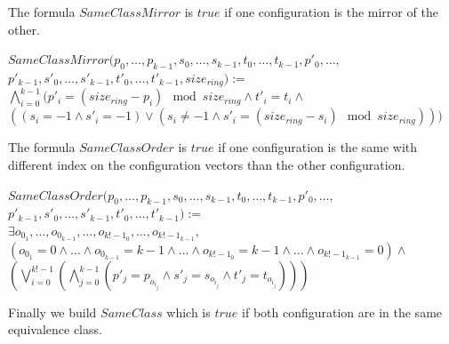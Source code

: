 \documentclass{article}
\begin{document}
\noindent The formula $SameClassMirror$ is $true$ if one configuration is the mirror of the other.

\begin{center}
    
    $SameClassMirror(p_{0}, \dots, p_{k-1}, s_{0}, \dots, s_{k-1}, t_{0}, \dots, t_{k-1}, p'_{0}, \dots,$\\
    $p'_{k-1}, s'_{0}, \dots, s'_{k-1}, t'_{0}, \dots, t'_{k-1}, size_{ring}):=$\\
    $\bigwedge_{i=0}^{k-1}( p'_{i} = (size_{ring} - p_{i})\mod{size_{ring}} \land t'_{i} = t_{i} \land$ \\
    $((s_{i} = -1 \land s'_{i} = -1) \lor (s_{i} \not= -1 \land s'_{i} = (size_{ring} - s_{i})\mod{size_{ring}}))) $
\end{center}

\noindent The formula $SameClassOrder$ is $true$ if one configuration is the same with different index on the configuration vectors than the other configuration.

\begin{center}
    
    $SameClassOrder(p_{0}, \dots, p_{k-1}, s_{0}, \dots, s_{k-1}, t_{0}, \dots, t_{k-1}, p'_{0}, \dots,$\\
    $p'_{k-1}, s'_{0}, \dots, s'_{k-1}, t'_{0}, \dots, t'_{k-1}):=$\\
    $\exists o_{0_{1}},\dots, o_{0_{k-1}}, \dots, o_{k!-1_{0}}, \dots, o_{k!-1_{k-1}},$\\
    $( o_{0_{1}} = 0 \land \dots \land o_{0_{k-1}} = k-1 \land \dots \land o_{k!-1_{0}} = k-1 \land \dots \land o_{k!-1_{k-1}} = 0 ) \land $\\
    $(\bigvee_{i=0}^{k!-1} (\bigwedge_{j=0}^{k-1} (p'_{j} = p_{o_{i_{j}}} \land s'_{j} = s_{o_{i_{j}}} \land t'_{j} = t_{o_{i_{j}}}  ) ) )$
\end{center}

\noindent Finally we build $SameClass$ which is $true$ if both configuration are in the same equivalence class.
\end{document}
